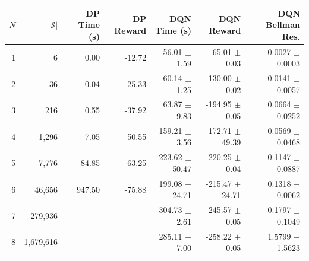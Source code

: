 \begin{tabular}{r r r r r r r}
\hline
$N$ & $|\mathcal{S}|$ & DP Time (s) & DP Reward & DQN Time (s) & DQN Reward & DQN Bellman Res. \\
\hline
1 & 6 & 0.00 & -12.72 & 56.01 $\pm$ 1.59 & -65.01 $\pm$ 0.03 & 0.0027 $\pm$ 0.0003 \\
2 & 36 & 0.04 & -25.33 & 60.14 $\pm$ 1.25 & -130.00 $\pm$ 0.02 & 0.0141 $\pm$ 0.0057 \\
3 & 216 & 0.55 & -37.92 & 63.87 $\pm$ 9.83 & -194.95 $\pm$ 0.05 & 0.0664 $\pm$ 0.0252 \\
4 & 1,296 & 7.05 & -50.55 & 159.21 $\pm$ 3.56 & -172.71 $\pm$ 49.39 & 0.0569 $\pm$ 0.0468 \\
5 & 7,776 & 84.85 & -63.25 & 223.62 $\pm$ 50.47 & -220.25 $\pm$ 0.04 & 0.1147 $\pm$ 0.0887 \\
6 & 46,656 & 947.50 & -75.88 & 199.08 $\pm$ 24.71 & -215.47 $\pm$ 24.71 & 0.1318 $\pm$ 0.0062 \\
7 & 279,936 & --- & --- & 304.73 $\pm$ 2.61 & -245.57 $\pm$ 0.05 & 0.1797 $\pm$ 0.1049 \\
8 & 1,679,616 & --- & --- & 285.11 $\pm$ 7.00 & -258.22 $\pm$ 0.05 & 1.5799 $\pm$ 1.5623 \\
\hline
\end{tabular}